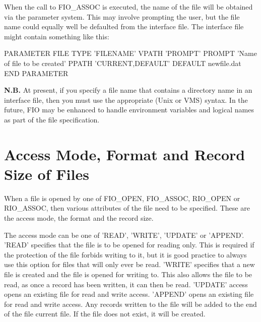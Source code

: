 \documentclass[twoside,11pt,nolof]{starlink}
\begin{document}
When the call to FIO\_ASSOC is executed, the name of the file will be obtained
via the parameter system. This may involve prompting the user, but the file
name could equally well be defaulted from the interface file. The interface
file might contain something like this:

\begin{terminalv}
PARAMETER  FILE
 TYPE     'FILENAME'
 VPATH    'PROMPT'
 PROMPT   'Name of file to be created'
 PPATH    'CURRENT,DEFAULT'
 DEFAULT  newfile.dat
END PARAMETER
\end{terminalv}

\textbf{N.B.} At present, if you specify a file name that contains a directory
name in an interface file, then you must use the appropriate (Unix or VMS)
syntax.
In the future, FIO may be enhanced to handle environment variables and
logical names as part of the file specification.

\section{Access Mode, Format and Record Size of Files}

When a file is opened by one of FIO\_OPEN, FIO\_ASSOC, RIO\_OPEN or
RIO\_ASSOC, then various attributes of the file need to be specified. These are
the access mode, the format and the record size.

The access mode can be one of 'READ', 'WRITE', 'UPDATE' or 'APPEND'. 'READ'
specifies that the file is to be opened for reading only. This is required if
the protection of the file forbids writing to it, but it is good practice to
always use this option for files that will only ever be read. 'WRITE' specifies
that a new file is created and the file is opened for writing to. This also
allows the file to be read, as once a record has been written, it can then be
read. 'UPDATE' access opens an existing file for read and write access.
'APPEND' opens an existing file for read and write access. Any records written
to the file will be added to the end of the file current file. If the file does
not exist, it will be created.
\end{document}

